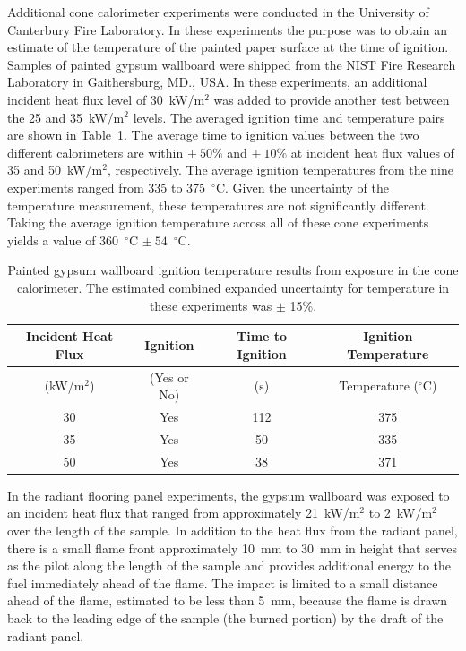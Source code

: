 \documentclass[twoside]{uocthesis}
\begin{document}
{Additional cone calorimeter experiments were conducted in the University of Canterbury Fire Laboratory.  In these experiments the purpose was to obtain an estimate of the temperature of the painted paper surface at the time of ignition.   Samples of painted gypsum wallboard were shipped from the NIST Fire Research Laboratory in Gaithersburg, MD., USA.  In these experiments, an additional incident heat flux level of 30~kW/m$^2$ was added to provide another test between the 25 and 35~kW/m$^2$ levels.  The averaged ignition time and temperature pairs are shown in Table~\ref{tab:Gypsum_wallboard_igntemp}.  The average time to ignition values between the two different calorimeters are within $\pm~50\%$ and $\pm~10\%$ at incident heat flux values of 35 and 50~kW/m$^2$, respectively.  The average ignition temperatures from the nine experiments ranged from 335 to 375~$^{\circ}$C.  Given the uncertainty of the temperature measurement, these temperatures are not significantly different.  Taking the average ignition temperature across all of these cone experiments yields a value of 360~$^{\circ}$C $\pm~54$~$^{\circ}$C.  
          
\begin{table}
	\centering
	\begin{tabular}{|c|c|c|c|}
		\hline Incident Heat Flux & Ignition & Time to Ignition & Ignition Temperature \\
		\hline (kW/m$^2$) & (Yes or No) & (s)  & Temperature ($^{\circ}$C)   \\ 
		\hline 30 	& Yes 	& 112	& 375 	 \\
		\hline 35	& Yes 	& 50 	& 335 	 \\
		\hline 50	& Yes 	& 38 	& 371 	 \\
		\hline
	\end{tabular}
	\caption[Painted gypsum wallboard ignition temperature results]{Painted gypsum wallboard ignition temperature results from exposure in the cone calorimeter.  The estimated combined expanded uncertainty for temperature in these experiments was $\pm$ 15\%.}
	\label{tab:Gypsum_wallboard_igntemp}
\end{table}

In the radiant flooring panel experiments, the gypsum wallboard was exposed to an incident heat flux that ranged from approximately 21~kW/m$^2$ to 2~kW/m$^2$ over the length of the sample. In addition to the heat flux from the radiant panel, there is a small flame front approximately 10~mm to 30~mm in height that serves as the pilot along the length of the sample and provides additional energy to the fuel immediately ahead of the flame.  The impact is limited to a small distance ahead of the flame, estimated to be less than 5~mm, because the flame is drawn back to the leading edge of the sample (the burned portion) by the draft of the radiant panel.  

}
\end{document}
